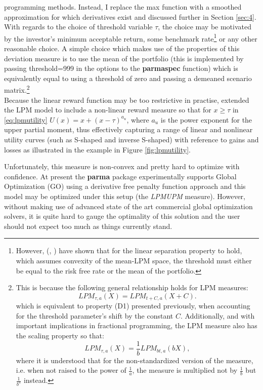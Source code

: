 programming methods. Instead, I replace the max function with a smoothed
approximation for which derivatives exist and discussed further in Section
\ref{sec:4}. With regards to the choice of threshold variable $\tau$, the
choice may be motivated by the investor's minimum acceptable return, some
benchmark rate\footnote{However, \citeauthor{Brogan2005}
(\citeyear{Brogan2005}, \citeyear{Brogan2008}) have shown that for the
linear separation property to hold, which assumes convexity of the mean-LPM
space, the threshold must either be equal to the risk free rate or the mean
of the portfolio.} or any other reasonable choice. A simple choice which
makes use of the properties of this deviation measure is to use the mean of
the portfolio (this is implemented by passing threshold=999 in the options
to the \textbf{parmaspec} function) which is equivalently equal to using a
threshold of zero and passing a demeaned scenario matrix.\footnote{This is
because the following general relationship holds for LPM measures:
\begin{equation}\label{eq:lpmscaling1}
LP{M_{\tau ,a}}\left( X \right)=LP{M_{t + C,a}}\left( {X + C} \right).
\end{equation}
which is equivalent to property (D1) presented previously, when accounting
for the threshold parameter's shift by the constant $C$. Additionally, and
with important implications in fractional programming, the LPM measure also
has the scaling property so that:
\begin{equation}\label{eq:lpmscaling2}
LP{M_{\tau ,a}}\left( X \right)=\frac{1}{b}LP{M_{bt,a}}\left( {bX} \right),
\end{equation}
where it is understood that for the non-standardized version of the measure,
i.e. when not raised to the power of $\frac{1}{a}$, the measure is multiplied
not
by $\frac{1}{b}$ but $\frac{1}{b^a}$ instead.}\\
Because the linear reward function may be too restrictive in practise,
\citet{Holthausen1981} extended the LPM model to include a non-linear
reward measure so that for $x\geq\tau$ in \eqref{eq:lpmutility}
$U\left(x\right)=x + {\left( {x - \tau } \right)^{{a_u}}}$, where $a_u$ is
the power exponent for the upper partial moment, thus effectively capturing a
range of linear and nonlinear utility curves (such as S-shaped and inverse
S-shaped) with reference to gains and losses as illustrated in the example in
Figure \ref{fig:lpmutility}.

Unfortunately, this measure is non-convex and pretty hard to optimize with
confidence. At present the \textbf{parma} package experimentally supports
Global Optimization (GO) using a derivative free penalty function approach
and this model may be optimized under this setup (the \emph{LPMUPM} measure).
However, without making use of advanced state of the art commercial global
optimization solvers, it is quite hard to gauge the optimality of this solution
and the user should not expect too much as things currently stand.
